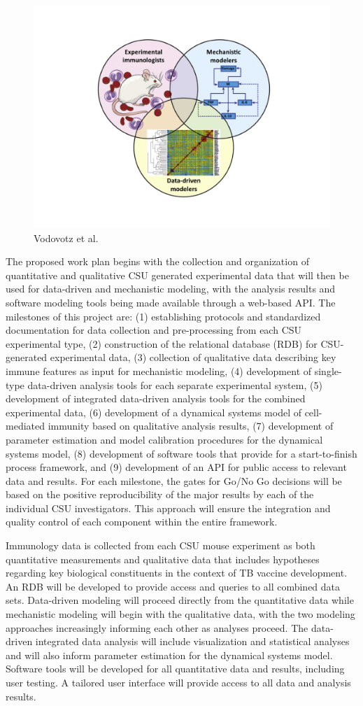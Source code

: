 \documentclass[]{book}
\begin{document}
\begin{figure}
\includegraphics[width=0.5\linewidth]{figures/Fig1} \caption{Vodovotz et al.}\label{fig:framework}
\end{figure}

The proposed work plan begins with the collection and organization of
quantitative and qualitative CSU generated experimental data that will
then be used for data-driven and mechanistic modeling, with the analysis
results and software modeling tools being made available through a
web-based API. The milestones of this project are: (1) establishing
protocols and standardized documentation for data collection and
pre-processing from each CSU experimental type, (2) construction of the
relational database (RDB) for CSU-generated experimental data, (3)
collection of qualitative data describing key immune features as input
for mechanistic modeling, (4) development of single-type data-driven
analysis tools for each separate experimental system, (5) development of
integrated data-driven analysis tools for the combined experimental
data, (6) development of a dynamical systems model of cell-mediated
immunity based on qualitative analysis results, (7) development of
parameter estimation and model calibration procedures for the dynamical
systems model, (8) development of software tools that provide for a
start-to-finish process framework, and (9) development of an API for
public access to relevant data and results. For each milestone, the
gates for Go/No Go decisions will be based on the positive
reproducibility of the major results by each of the individual CSU
investigators. This approach will ensure the integration and quality
control of each component within the entire framework.

Immunology data is collected from each CSU mouse experiment as both
quantitative measurements and qualitative data that includes hypotheses
regarding key biological constituents in the context of TB vaccine
development. An RDB will be developed to provide access and queries to
all combined data sets. Data-driven modeling will proceed directly from
the quantitative data while mechanistic modeling will begin with the
qualitative data, with the two modeling approaches increasingly
informing each other as analyses proceed. The data-driven integrated
data analysis will include visualization and statistical analyses and
will also inform parameter estimation for the dynamical systems model.
Software tools will be developed for all quantitative data and results,
including user testing. A tailored user interface will provide access to
all data and analysis results.
\end{document}
